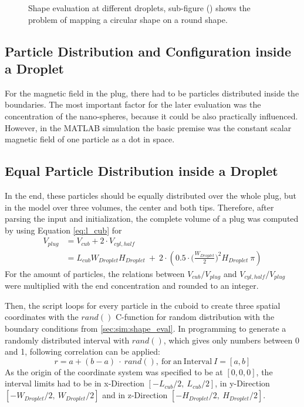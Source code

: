 \begin{figure}
	\caption{Shape evaluation at different droplets, sub-figure (\protect{}) shows the problem of mapping a circular shape on a round shape.} 
	
\end{figure}
\newpage
\subsection{Particle Distribution and Configuration inside a Droplet}
For the magnetic field in the plug, there had to be particles distributed inside the boundaries. The most important factor for the later evaluation was the concentration of the nano-spheres, because it could be also practically influenced. However, in the MATLAB simulation the basic premise was the constant scalar magnetic field of one particle as a dot in space.
\subsection{Equal Particle Distribution inside a Droplet}
In the end, these particles should be equally distributed over the whole plug, but in the model over three volumes, the center and both tips. Therefore, after parsing the input and initialization, the complete volume of a plug was computed by using Equation \ref{eq:l_cub} for
\begin{align}
V_{plug} &= V_{cub} + 2 \cdot V_{cyl,half} \\
& = L_{cub} W_{Droplet} H_{Droplet}\ +\ 2 \cdot ( 0.5 \cdot \bigg(\frac{W_{Droplet}}{2}\bigg)^2 H_{Droplet}\ \pi)
\label{eq:volume}
\end{align}
For the amount of particles, the relations between $V_{cub}/V_{plug}$ and $V_{cyl,half}/V_{plug}$ were multiplied with the end concentration and rounded to an integer. 

Then, the script loops for every particle in the cuboid to create three spatial coordinates with the $rand()$ C-function for random distribution with the boundary conditions from \ref{sec:sim:shape_eval}. In programming to generate a randomly distributed interval with $rand()$, which gives only numbers between 0 and 1, following correlation can be applied:
\begin{equation}
r = a + (b-a)\ \cdot\ rand(),\ \mathrm{for\ an\ Interval}\ I = [a,b]
\end{equation}
As the origin of the coordinate system was specified to be at $[0,0,0]$, the interval limits had to be in x-Direction $[-L_{cub}/2,\ L_{cub}/2]$, in y-Direction $[-W_{Droplet}/2,\ W_{Droplet}/2]$ and in z-Direction $[-H_{Droplet}/2,\ H_{Droplet}/2]$.

